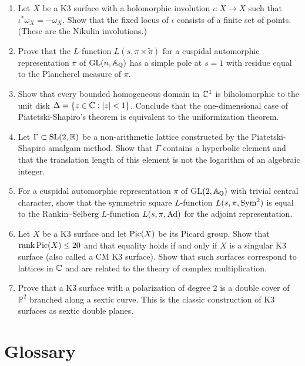 \begin{enumerate}
    \item [I] Let \(X\) be a K3 surface with a holomorphic involution \(\iota: X \to X\) such that \(\iota^*\omega_X = -\omega_X\). Show that the fixed locus of \(\iota\) consists of a finite set of points. (These are the Nikulin involutions.)

    \item [A] Prove that the \(L\)-function \(L(s, \pi \times \widetilde{\pi})\) for a cuspidal automorphic representation \(\pi\) of \(\operatorname{GL}(n,\mathbb{A}_{\mathbb{Q}})\) has a simple pole at \(s = 1\) with residue equal to the Plancherel measure of \(\pi\).

    \item [B] Show that every bounded homogeneous domain in \(\mathbb{C}^1\) is biholomorphic to the unit disk \(\Delta = \{z \in \mathbb{C}: |z| < 1\}\). Conclude that the one-dimensional case of Piatetski-Shapiro's theorem is equivalent to the uniformization theorem.

    \item [A] Let \(\Gamma \subset \operatorname{SL}(2,\mathbb{R})\) be a non-arithmetic lattice constructed by the Piatetski-Shapiro amalgam method. Show that \(\Gamma\) contains a hyperbolic element and that the translation length of this element is not the logarithm of an algebraic integer.

    \item [I] For a cuspidal automorphic representation \(\pi\) of \(\operatorname{GL}(2,\mathbb{A}_{\mathbb{Q}})\) with trivial central character, show that the symmetric square \(L\)-function \(L(s, \pi, \operatorname{Sym}^2)\) is equal to the Rankin--Selberg \(L\)-function \(L(s, \pi, \operatorname{Ad})\) for the adjoint representation.

    \item [I] Let \(X\) be a K3 surface and let \(\operatorname{Pic}(X)\) be its Picard group. Show that \(\rank \operatorname{Pic}(X) \leq 20\) and that equality holds if and only if \(X\) is a singular K3 surface (also called a CM K3 surface). Show that such surfaces correspond to lattices in \(\mathbb{C}\) and are related to the theory of complex multiplication.

    \item [I] Prove that a K3 surface with a polarization of degree 2 is a double cover of \(\mathbb{P}^2\) branched along a sextic curve. This is the classic construction of K3 surfaces as sextic double planes.
\end{enumerate}

\section*{Glossary}


